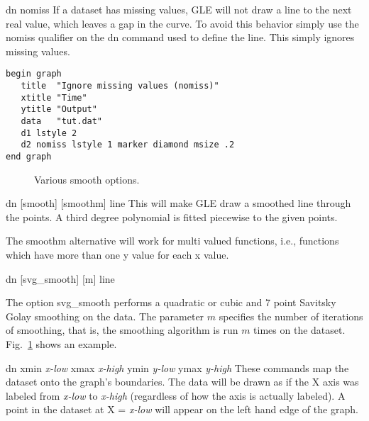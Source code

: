\begin{commanddescription}
\item[{\sf dn nomiss}  ]
If a dataset has missing values, GLE will not draw a line to the next
real value, which leaves a gap in the curve.  To avoid this
behavior simply use the {\sf nomiss} qualifier on the {\sf dn} command
used to define the line. This simply ignores missing values.

\begin{minipage}[c]{8cm}
\begin{Verbatim}
begin graph
   title  "Ignore missing values (nomiss)"
   xtitle "Time"
   ytitle "Output"
   data   "tut.dat"
   d1 lstyle 2
   d2 nomiss lstyle 1 marker diamond msize .2
end graph
\end{Verbatim}
\end{minipage}
\hfill
\begin{minipage}[c]{7cm}
\mbox{}
\end{minipage}

\begin{figure}[tb]
\centering

\caption{\label{smooth:fig}Various smooth options.}
\end{figure}

\item[{\sf dn [smooth] [smoothm] line}]
  
This will make GLE draw a smoothed line through the points.
A third degree polynomial is fitted piecewise to the given points.

The {\sf smoothm} alternative will work for multi valued functions,
i.e., functions which have more than one y value for each x value.

\item[{\sf dn [svg\_smooth] [m] line}]

The option {\sf svg\_smooth} performs a quadratic or cubic and 7 point Savitsky Golay smoothing on the data. The parameter $m$ specifies the number of iterations of smoothing, that is, the smoothing algorithm is run $m$ times on the dataset. Fig.~\ref{smooth:fig} shows an example.

\item[{\sf dn xmin {\it x-low} xmax {\it x-high} ymin {\it y-low} ymax {\it y-high}}  ]
   
These commands map the dataset onto the graph's boundaries.
The data will be drawn as if the X axis was labeled from {\it x-low} to {\it
x-high} (regardless of how the axis is actually labeled).  A point in the
dataset at X = {\it x-low} will appear on the left hand edge of the graph.


\end{commanddescription}
